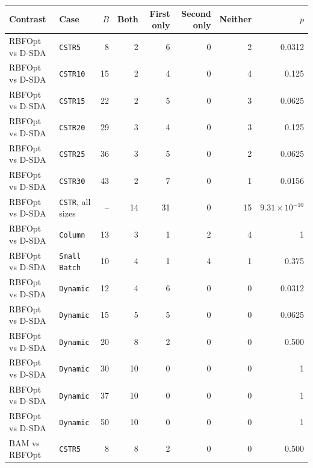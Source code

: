 \begin{tabular}{llrrrrrr}\toprule
Contrast & Case & \(B\) & Both & First only & Second only & Neither & \(p\)\\\midrule
RBFOpt vs D-SDA & \texttt{CSTR5} & 8 & 2 & 6 & 0 & 2 & 0.0312 \\
RBFOpt vs D-SDA & \texttt{CSTR10} & 15 & 2 & 4 & 0 & 4 & 0.125 \\
RBFOpt vs D-SDA & \texttt{CSTR15} & 22 & 2 & 5 & 0 & 3 & 0.0625 \\
RBFOpt vs D-SDA & \texttt{CSTR20} & 29 & 3 & 4 & 0 & 3 & 0.125 \\
RBFOpt vs D-SDA & \texttt{CSTR25} & 36 & 3 & 5 & 0 & 2 & 0.0625 \\
RBFOpt vs D-SDA & \texttt{CSTR30} & 43 & 2 & 7 & 0 & 1 & 0.0156 \\
RBFOpt vs D-SDA & \texttt{CSTR}, all sizes & -- & 14 & 31 & 0 & 15 & \(9.31\times10^{-10}\) \\
RBFOpt vs D-SDA & \texttt{Column} & 13 & 3 & 1 & 2 & 4 & 1 \\
RBFOpt vs D-SDA & \texttt{Small Batch} & 10 & 4 & 1 & 4 & 1 & 0.375 \\
RBFOpt vs D-SDA & \texttt{Dynamic} & 12 & 4 & 6 & 0 & 0 & 0.0312 \\
RBFOpt vs D-SDA & \texttt{Dynamic} & 15 & 5 & 5 & 0 & 0 & 0.0625 \\
RBFOpt vs D-SDA & \texttt{Dynamic} & 20 & 8 & 2 & 0 & 0 & 0.500 \\
RBFOpt vs D-SDA & \texttt{Dynamic} & 30 & 10 & 0 & 0 & 0 & 1 \\
RBFOpt vs D-SDA & \texttt{Dynamic} & 37 & 10 & 0 & 0 & 0 & 1 \\
RBFOpt vs D-SDA & \texttt{Dynamic} & 50 & 10 & 0 & 0 & 0 & 1 \\
BAM vs RBFOpt & \texttt{CSTR5} & 8 & 8 & 2 & 0 & 0 & 0.500 \\
\bottomrule\end{tabular}
